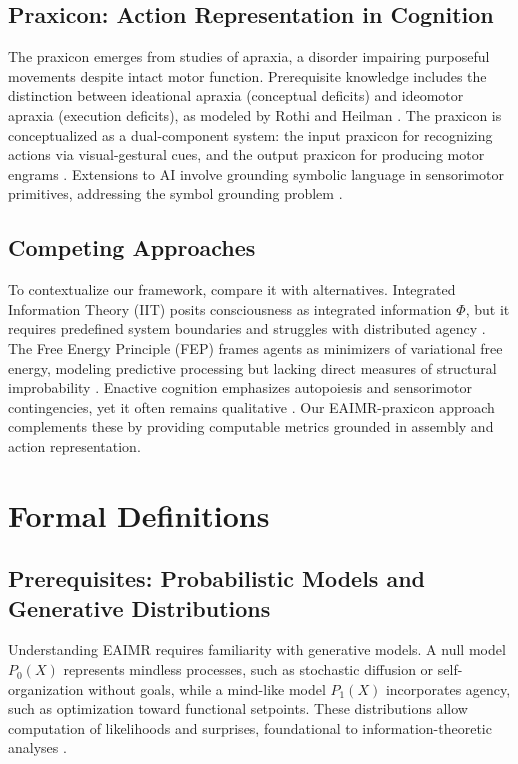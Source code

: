 \documentclass{article}
\begin{document}
\subsection{Praxicon: Action Representation in Cognition}
The praxicon emerges from studies of apraxia, a disorder impairing purposeful movements despite intact motor function. Prerequisite knowledge includes the distinction between ideational apraxia (conceptual deficits) and ideomotor apraxia (execution deficits), as modeled by Rothi and Heilman \citep{mantovani2010}. The praxicon is conceptualized as a dual-component system: the input praxicon for recognizing actions via visual-gestural cues, and the output praxicon for producing motor engrams \citep{peigneux2004}. Extensions to AI involve grounding symbolic language in sensorimotor primitives, addressing the symbol grounding problem \citep{harnad1990, pastra2011}.

\subsection{Competing Approaches}
To contextualize our framework, compare it with alternatives. Integrated Information Theory (IIT) posits consciousness as integrated information \(\Phi\), but it requires predefined system boundaries and struggles with distributed agency \citep{tononi2004}. The Free Energy Principle (FEP) frames agents as minimizers of variational free energy, modeling predictive processing but lacking direct measures of structural improbability \citep{friston2010}. Enactive cognition emphasizes autopoiesis and sensorimotor contingencies, yet it often remains qualitative \citep{barandiaran2009}. Our EAIMR-praxicon approach complements these by providing computable metrics grounded in assembly and action representation.

\section{Formal Definitions}
\label{sec:formal}

\subsection{Prerequisites: Probabilistic Models and Generative Distributions}
Understanding EAIMR requires familiarity with generative models. A null model \(P_0(X)\) represents mindless processes, such as stochastic diffusion or self-organization without goals, while a mind-like model \(P_1(X)\) incorporates agency, such as optimization toward functional setpoints. These distributions allow computation of likelihoods and surprises, foundational to information-theoretic analyses \citep{cover2006}.
\end{document}
